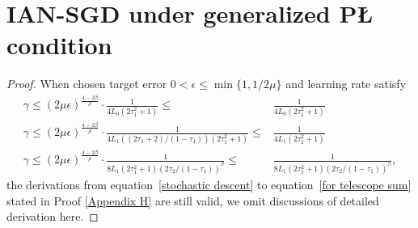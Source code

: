 \documentclass[10pt]{article} %
\def\eqref#1{equation~\ref{#1}}
\newtheorem{proof}{Proof}
\begin{document}
\section{IAN-SGD under generalized P{\L} condition}\label{Appendix J}
\mainlemmathree*
\begin{proof}
    When chosen target error $0<\epsilon \leq \min\{1,1/2\mu\}$ and
    learning rate satisfy
    \begin{align}
        \gamma \leq (2\mu\epsilon)^{\frac{4-2\beta}{\rho}}\cdot \frac{1}{4L_0(2\tau_1^2+1)}\leq& \frac{1}{4L_0(2\tau_1^2+1)} \nonumber\\
        \gamma \leq(2\mu\epsilon)^{\frac{4-2\beta}{\rho}}\cdot\frac{1}{4L_1((2\tau_1+2)/(1-\tau_1))(2\tau_1^2+1)}\leq& \frac{1}{4L_1(2\tau_1^2+1)} \nonumber\\
        \gamma \leq (2\mu\epsilon)^{\frac{4-2\beta}{\rho}}\cdot \frac{1}{8L_1(2\tau_1^2+1)(2\tau_2/(1-\tau_1))^{\beta}}\leq& \frac{1}{8L_1(2\tau_1^2+1)(2\tau_2/(1-\tau_1))^{\beta}},
    \end{align}
    the derivations from \eqref{stochastic descent} to \eqref{for telescope sum} stated in Proof \ref{Appendix H} are still valid, we omit discussions of detailed derivation here. 


\end{proof}
\end{document}

